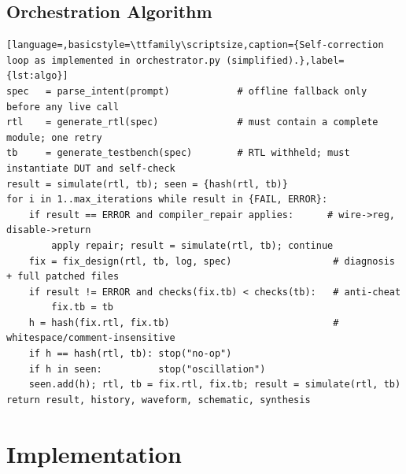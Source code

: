 \documentclass[11pt,a4paper]{article}
\begin{document}
\subsection{Orchestration Algorithm}
\begin{lstlisting}[language=,basicstyle=\ttfamily\scriptsize,caption={Self-correction loop as implemented in orchestrator.py (simplified).},label={lst:algo}]
spec   = parse_intent(prompt)            # offline fallback only before any live call
rtl    = generate_rtl(spec)              # must contain a complete module; one retry
tb     = generate_testbench(spec)        # RTL withheld; must instantiate DUT and self-check
result = simulate(rtl, tb); seen = {hash(rtl, tb)}
for i in 1..max_iterations while result in {FAIL, ERROR}:
    if result == ERROR and compiler_repair applies:      # wire->reg, disable->return
        apply repair; result = simulate(rtl, tb); continue
    fix = fix_design(rtl, tb, log, spec)                  # diagnosis + full patched files
    if result != ERROR and checks(fix.tb) < checks(tb):   # anti-cheat
        fix.tb = tb
    h = hash(fix.rtl, fix.tb)                             # whitespace/comment-insensitive
    if h == hash(rtl, tb): stop("no-op")
    if h in seen:          stop("oscillation")
    seen.add(h); rtl, tb = fix.rtl, fix.tb; result = simulate(rtl, tb)
return result, history, waveform, schematic, synthesis
\end{lstlisting}

\section{Implementation}
\label{sec:impl}
\end{document}
